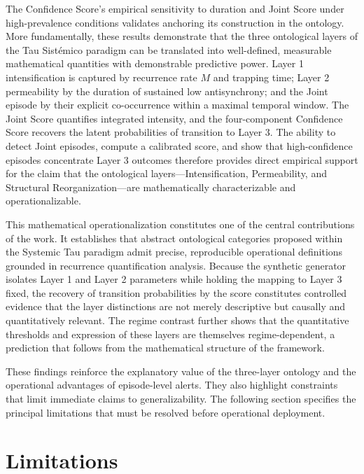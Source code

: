 \documentclass[11pt,a4paper]{article}
\begin{document}
The Confidence Score's empirical sensitivity to duration and Joint Score under high-prevalence conditions validates anchoring its construction in the ontology. More fundamentally, these results demonstrate that the three ontological layers of the Tau Sistémico paradigm can be translated into well-defined, measurable mathematical quantities with demonstrable predictive power. Layer 1 intensification is captured by recurrence rate $M$ and trapping time; Layer 2 permeability by the duration of sustained low antisynchrony; and the Joint episode by their explicit co-occurrence within a maximal temporal window. The Joint Score quantifies integrated intensity, and the four-component Confidence Score recovers the latent probabilities of transition to Layer 3. The ability to detect Joint episodes, compute a calibrated score, and show that high-confidence episodes concentrate Layer 3 outcomes therefore provides direct empirical support for the claim that the ontological layers---Intensification, Permeability, and Structural Reorganization---are mathematically characterizable and operationalizable.

This mathematical operationalization constitutes one of the central contributions of the work. It establishes that abstract ontological categories proposed within the Systemic Tau paradigm admit precise, reproducible operational definitions grounded in recurrence quantification analysis. Because the synthetic generator isolates Layer 1 and Layer 2 parameters while holding the mapping to Layer 3 fixed, the recovery of transition probabilities by the score constitutes controlled evidence that the layer distinctions are not merely descriptive but causally and quantitatively relevant. The regime contrast further shows that the quantitative thresholds and expression of these layers are themselves regime-dependent, a prediction that follows from the mathematical structure of the framework.

These findings reinforce the explanatory value of the three-layer ontology and the operational advantages of episode-level alerts. They also highlight constraints that limit immediate claims to generalizability. The following section specifies the principal limitations that must be resolved before operational deployment.

\section{Limitations}
\end{document}
